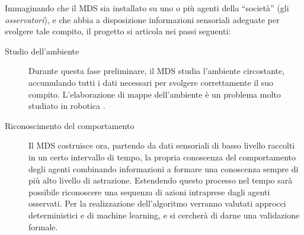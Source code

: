 \documentclass[paper=a4, fontsize=11pt]{scrartcl} %
\numberwithin{equation}{section} %
\numberwithin{table}{section} %
\begin{document}
Immaginando che il MDS sia installato su uno o più agenti della ``società'' (gli \textit{osservatori}), e che abbia a disposizione 
informazioni
sensoriali adeguate per svolgere tale compito, il
progetto si articola nei passi seguenti:
\begin{description}
\item[Studio dell'ambiente] Durante questa fase preliminare, 
il MDS studia l'ambiente circostante, accumulando tutti i dati
necessari per svolgere correttamente il suo compito. L'elaborazione
di mappe dell'ambiente è un problema molto studiato in robotica \cite{mapping}.

\item[Riconoscimento del comportamento] Il MDS
	costruisce ora, partendo da dati sensoriali di basso livello raccolti 
	in un certo intervallo di tempo, la propria
	conoscenza del comportamento degli agenti combinando informazioni 
	a formare una conoscenza sempre di più alto livello di astrazione. Estendendo questo processo nel tempo
	sarà possibile riconoscere una sequenza di azioni intraprese
	dagli agenti osservati. Per la realizzazione dell'algoritmo
	verranno valutati approcci deterministici e di machine learning, 
	e si cercherà di darne una validazione formale.  
	

\end{description}
\end{document}
